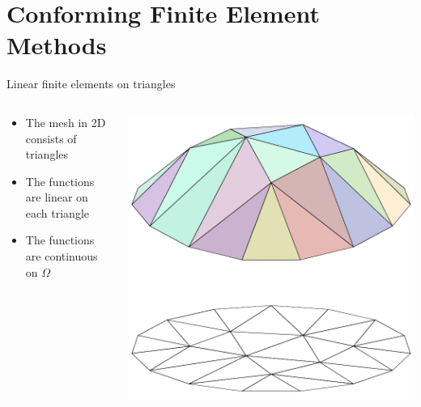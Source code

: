 \documentclass[american,ignorenonframetext,notheorems,aspectratio=1610]{beamer}
\begin{document}
\section{Conforming Finite Element Methods}
\frame{\sectoc}

\begin{frame}
  \begin{block}{Linear finite elements on triangles}
    \begin{columns}
      \begin{column}{.54\textwidth}
        \begin{itemize}
        \item The mesh in 2D consists of triangles
        \item The functions are linear on each triangle
        \item The functions are continuous on $\Omega$
        \end{itemize}
      \end{column}
      \begin{column}{.45\textwidth}
        \includegraphics[width=\textwidth]{fig/piecewise-linear-function}
      \end{column}
    \end{columns}
  \end{block}
\end{frame}
\end{document}
